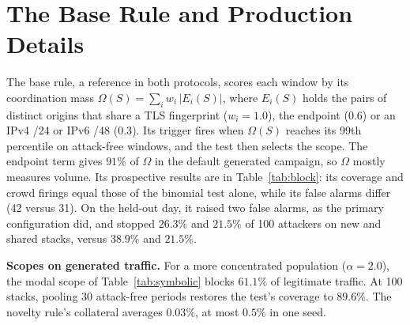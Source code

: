 \documentclass[conference,letterpaper,10pt]{IEEEtran}
\newcommand\1{\textit{(i)}}
\newcommand\2{\textit{(ii)}}
\newcommand\3{\textit{(iii)}}
\newcommand\4{\textit{(iv)}}
\newcommand\5{\textit{(v)}}
\newcommand\6{\textit{(vi)}}
\newcommand\7{\textit{(vii)}}
\newcommand\8{\textit{(viii)}}
\newcommand\9{\textit{(ix)}}
\begin{document}



\appendices

\section{The Base Rule and Production Details}
\label{app:window}

The base rule, a reference in both protocols, scores each window by its coordination mass $\Omega(S) = \sum_i w_i\,|E_i(S)|$, where $E_i(S)$ holds the pairs of distinct origins that share a TLS fingerprint ($w_i = 1.0$), the endpoint ($0.6$) or an IPv4 /24 or IPv6 /48 ($0.3$). Its trigger fires when $\Omega(S)$ reaches its 99th percentile on attack-free windows, and the test then selects the scope. The endpoint term gives $91\%$ of $\Omega$ in the default generated campaign, so $\Omega$ mostly measures volume. Its prospective results are in Table~\ref{tab:block}: its coverage and crowd firings equal those of the binomial test alone, while its false alarms differ (42 versus 31). On the held-out day, it raised two false alarms, as the primary configuration did, and stopped $26.3\%$ and $21.5\%$ of 100 attackers on new and shared stacks, versus $38.9\%$ and $21.5\%$.

\textbf{Scopes on generated traffic.} For a more concentrated population ($\alpha = 2.0$), the modal scope of Table~\ref{tab:symbolic} blocks $61.1\%$ of legitimate traffic. At 100 stacks, pooling 30 attack-free periods restores the test's coverage to $89.6\%$. The novelty rule's collateral averages $0.03\%$, at most $0.5\%$ in one seed. 
\end{document}
